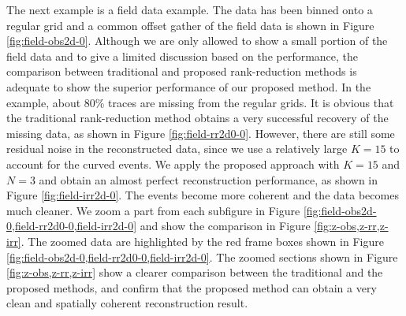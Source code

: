 The next example is a field data example. The data has been binned onto a regular grid and a common offset gather of the field data is shown in Figure \ref{fig:field-obs2d-0}. Although we are only allowed to show a small portion of the field data and to give a limited discussion based on the performance, the comparison between traditional and proposed rank-reduction methods is adequate to show the superior performance of our proposed method. In the example, about 80\% traces are missing from the regular grids. It is obvious that the traditional rank-reduction method obtains a very successful recovery of the missing data, as shown in Figure \ref{fig:field-rr2d0-0}. However, there are still some residual noise in the reconstructed data, since we use a relatively large $K=15$ to account for the curved events. We apply the proposed approach with $K=15$ and $N=3$ and obtain an almost perfect reconstruction performance, as shown in Figure \ref{fig:field-irr2d-0}. The events become more coherent and the data becomes much cleaner. We zoom a part from each subfigure in Figure \ref{fig:field-obs2d-0,field-rr2d0-0,field-irr2d-0} and show the comparison in Figure \ref{fig:z-obs,z-rr,z-irr}. The zoomed data are highlighted by the red frame boxes shown in Figure \ref{fig:field-obs2d-0,field-rr2d0-0,field-irr2d-0}. The zoomed sections shown in Figure \ref{fig:z-obs,z-rr,z-irr} show a clearer comparison between the traditional and the proposed methods, and confirm that the proposed method can obtain a very clean and spatially coherent reconstruction result. 



